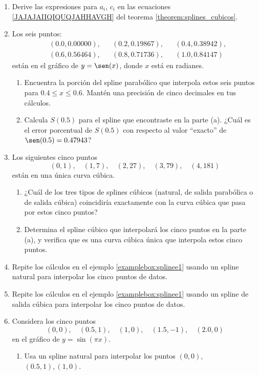 \begin{enumerate}
    \item Derive las expresiones para $a_i$, $c_i$ en las ecuaciones \eqref{JAJAJAIIQIQUQJAHHAVGH} del teorema \ref{theorem:splines_cubicos}.
    \item Los seis puntos:
    \begin{align*}
        & (0.0, 0.00000), && (0.2, 0.19867), && (0.4, 0.38942), \\
        & (0.6, 0.56464), && (0.8, 0.71736), && (1.0, 0.84147)
    \end{align*}
    están en el gráfico de $y = \sen(x)$, donde $x$ está en radianes.
    \newpage
    \begin{enumerate}
        \item Encuentra la porción del spline parabólico que interpola estos seis puntos para $0.4 \leq x \leq 0.6$. Mantén una precisión de cinco decimales en tus cálculos.
        \item Calcula $S(0.5)$ para el spline que encontraste en la parte (a). ¿Cuál es el error porcentual de $S(0.5)$ con respecto al valor “exacto” de $\sen(0.5) = 0.47943$?
    \end{enumerate}
    \item Los siguientes cinco puntos
    $$(0, 1), \quad (1, 7), \quad (2, 27), \quad (3, 79), \quad (4, 181)$$
    están en una única curva cúbica.
    \begin{enumerate}
        \item ¿Cuál de los tres tipos de splines cúbicos (natural, de salida parabólica o de salida cúbica) coincidiría exactamente con la curva cúbica que pasa por estos cinco puntos?
        \item Determina el spline cúbico que interpolará los cinco puntos en la parte (a), y verifica que es una curva cúbica única que interpola estos cinco puntos.
    \end{enumerate}
    \item Repite los cálculos en el ejemplo \ref{examplebox:splinee1} usando un spline natural para interpolar los cinco puntos de datos.
    \item Repite los cálculos en el ejemplo \ref{examplebox:splinee1} usando un spline de salida cúbica para interpolar los cinco puntos de datos.
    \item Considera los cinco puntos
    $$(0, 0), \quad (0.5, 1), \quad (1, 0), \quad (1.5, -1), \quad (2.0, 0)$$
    en el gráfico de $y = \sin(\pi x)$.
    \begin{enumerate}
        \item Usa un spline natural para interpolar los puntos $(0, 0)$, $(0.5, 1), (1, 0)$.

\end{enumerate}
\end{enumerate}

